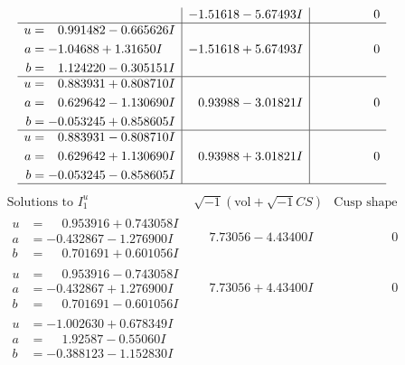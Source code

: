 \documentclass[1p]{elsarticle_modified}
\theoremstyle{definition}
\newcommand{\I}{\sqrt{-1}}
\begin{document}
$$\begin{array}{c|c|c}
 & -1.51618 - 5.67493 I & \phantom{-0.000000 } 0 \\ \hline\begin{aligned}
u &= \phantom{-}0.991482 - 0.665626 I \\
a &= -1.04688 + 1.31650 I \\
b &= \phantom{-}1.124220 - 0.305151 I\end{aligned}
 & -1.51618 + 5.67493 I & \phantom{-0.000000 } 0 \\ \hline\begin{aligned}
u &= \phantom{-}0.883931 + 0.808710 I \\
a &= \phantom{-}0.629642 - 1.130690 I \\
b &= -0.053245 + 0.858605 I\end{aligned}
 & \phantom{-}0.93988 - 3.01821 I & \phantom{-0.000000 } 0 \\ \hline\begin{aligned}
u &= \phantom{-}0.883931 - 0.808710 I \\
a &= \phantom{-}0.629642 + 1.130690 I \\
b &= -0.053245 - 0.858605 I\end{aligned}
 & \phantom{-}0.93988 + 3.01821 I & \phantom{-0.000000 } 0\\
 \hline 
 \end{array}$$\newpage$$\begin{array}{c|c|c}  
\text{Solutions to }I^u_{1}& \I (\text{vol} + \sqrt{-1}CS) & \text{Cusp shape}\\
 \hline 
\begin{aligned}
u &= \phantom{-}0.953916 + 0.743058 I \\
a &= -0.432867 - 1.276900 I \\
b &= \phantom{-}0.701691 + 0.601056 I\end{aligned}
 & \phantom{-}7.73056 - 4.43400 I & \phantom{-0.000000 } 0 \\ \hline\begin{aligned}
u &= \phantom{-}0.953916 - 0.743058 I \\
a &= -0.432867 + 1.276900 I \\
b &= \phantom{-}0.701691 - 0.601056 I\end{aligned}
 & \phantom{-}7.73056 + 4.43400 I & \phantom{-0.000000 } 0 \\ \hline\begin{aligned}
u &= -1.002630 + 0.678349 I \\
a &= \phantom{-}1.92587 - 0.55060 I \\
b &= -0.388123 - 1.152830 I\end{aligned}

\end{array}$$
\end{document}
